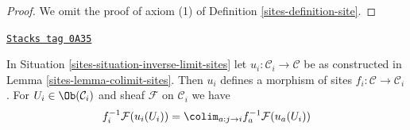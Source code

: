 \begin{proof}
\medskip\noindent
We omit the proof of axiom (1) of Definition \ref{sites-definition-site}.
\end{proof}

\begin{lemma}
\label{sites-lemma-compute-pullback-to-limit}
\href{https://stacks.math.columbia.edu/tag/0A35}{\texttt{Stacks tag 0A35}}

In Situation \ref{sites-situation-inverse-limit-sites} let
$u_i : \mathcal{C}_i \to \mathcal{C}$ be as constructed in
Lemma \ref{sites-lemma-colimit-sites}. Then $u_i$ defines a morphism
of sites $f_i : \mathcal{C} \to \mathcal{C}_i$. For
$U_i \in \Ob(\mathcal{C}_i)$ and sheaf $\mathcal{F}$ on $\mathcal{C}_i$ we have
\begin{equation}
\label{equation-compute-pullback-to-limit}
f_i^{-1}\mathcal{F}(u_i(U_i)) =
\colim_{a : j \to i} f_a^{-1}\mathcal{F}(u_a(U_i))
\end{equation}
\end{lemma}

